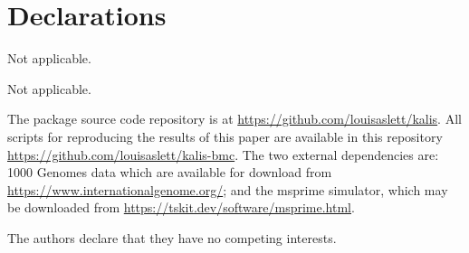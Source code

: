\documentclass[pdflatex,referee,lineno,sn-nature]{sn-jnl}%
\newcommand{\pkg}[1]{{\fontseries{m}\fontseries{b}\selectfont #1}}
\begin{document}



\section*{Declarations}


Not applicable.


Not applicable.


The package source code repository is at \url{https://github.com/louisaslett/kalis}.
All scripts for reproducing the results of this paper are available in this repository \url{https://github.com/louisaslett/kalis-bmc}.
The two external dependencies are: 1000 Genomes data which are available for download from \url{https://www.internationalgenome.org/}; and the msprime simulator, which may be downloaded from \url{https://tskit.dev/software/msprime.html}.


The authors declare that they have no competing interests.
\end{document}
